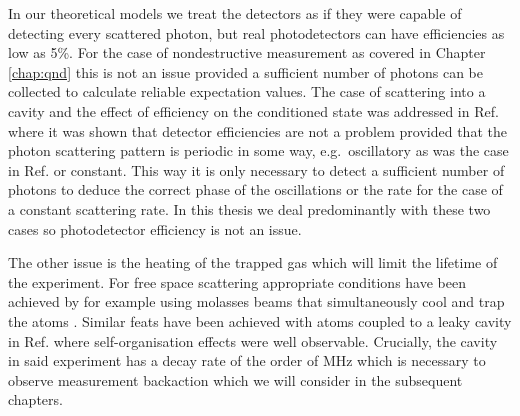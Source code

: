 In our theoretical models we treat the detectors as if they were
capable of detecting every scattered photon, but real photodetectors
can have efficiencies as low as 5\%. For the case of nondestructive
measurement as covered in Chapter \ref{chap:qnd} this is not an issue
provided a sufficient number of photons can be collected to calculate
reliable expectation values. The case of scattering into a cavity and
the effect of efficiency on the conditioned state was addressed in
Ref. \cite{mazzucchi2016njp} where it was shown that detector
efficiencies are not a problem provided that the photon scattering
pattern is periodic in some way, e.g.~oscillatory as was the case in
Ref. \cite{mazzucchi2016njp} or constant. This way it is only
necessary to detect a sufficient number of photons to deduce the
correct phase of the oscillations or the rate for the case of a
constant scattering rate. In this thesis we deal predominantly with
these two cases so photodetector efficiency is not an issue.

The other issue is the heating of the trapped gas which will limit the
lifetime of the experiment. For free space scattering appropriate
conditions have been achieved by for example using molasses beams that
simultaneously cool and trap the atoms \cite{weitenberg2011,
  weitenbergThesis}. Similar feats have been achieved with atoms
coupled to a leaky cavity in Ref. \cite{brennecke2013} where
self-organisation effects were well observable. Crucially, the cavity
in said experiment has a decay rate of the order of MHz which is
necessary to observe measurement backaction which we will consider in
the subsequent chapters.
